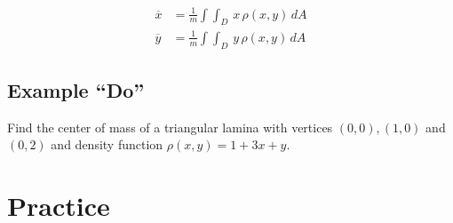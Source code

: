 \documentclass[11pt,letterpaper]{article}
\newif\ifshowsolutions
\newcommand{\sol}[1]{%
\ifshowsolutions
\par\vspace{0.3em}{\color{red}#1}\par
\fi
}
\begin{document}
\begin{align*}
    \overline{x}&=\frac{1}{m}\int\int_D \, x \, \rho(x,y) \, dA\\
    \overline{y}&=\frac{1}{m}\int\int_D \, y \, \rho(x,y) \, dA
\end{align*}


\subsection{Example ``Do''}

Find the center of mass of a triangular lamina with vertices $(0,0),(1,0)$ and $(0,2)$ and density function $\rho(x,y)=1+3x+y$.

\sol{%
\textbf{Solution.}
From the previous example, $m=\dfrac{8}{3}$ and the inner integral of $\rho$ was $4-4x^2$ over $0\leq y\leq 2-2x$.
\begin{align*}
M_y &= \iint_D x\rho\,dA
= \int_0^1 x(4-4x^2)\,dx
= \int_0^1(4x-4x^3)\,dx
= \bigl[2x^2-x^4\bigr]_0^1
= 1,
\end{align*}
so $\displaystyle\overline{x}=\frac{M_y}{m}=\frac{1}{8/3}=\frac{3}{8}$.
\begin{align*}
M_x &= \iint_D y\rho\,dA
= \int_0^1\int_0^{2-2x} y(1+3x+y)\,dy\,dx
= \int_0^1\int_0^{h}(y+3xy+y^2)\,dy\,dx,
\end{align*}
where $h=2-2x$.
\begin{align*}
\Bigl[\frac{y^2}{2}+\frac{3x y^2}{2}+\frac{y^3}{3}\Bigr]_0^{h}
&= \frac{h^2}{2}(1+3x)+\frac{h^3}{3}
= 2(1-x)^2(1+3x)+\frac{8}{3}(1-x)^3.
\end{align*}
Expanding and integrating:
\begin{align*}
M_x &= \int_0^1\Bigl(\frac{14}{3}-6x-2x^2+\frac{10}{3}x^3\Bigr)\,dx
= \Bigl[\frac{14}{3}x-3x^2-\frac{2}{3}x^3+\frac{5}{6}x^4\Bigr]_0^1
= \frac{11}{6}.
\end{align*}
Thus $\displaystyle\overline{y}=\frac{M_x}{m}=\frac{11/6}{8/3}=\frac{11}{16}$.\\[0.4em]
Center of mass: $\displaystyle\Bigl(\frac{3}{8},\frac{11}{16}\Bigr)$.
}

\vfill 

\pagebreak

\section{Practice}

\subsection{}
\end{document}
